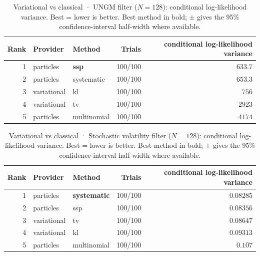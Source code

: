 \begin{table}[!htbp]
\centering
\small
\caption{Variational vs classical · UNGM filter ($N=128$): conditional log-likelihood variance. Best = lower is better. Best method in bold; $\pm$ gives the 95\% confidence-interval half-width where available.}
\label{tab:variational-vs-classical-ungm-filter-conditional-loglik-variance}
\begin{tabular}{rllrr}
\toprule
Rank & Provider & Method & Trials & conditional log-likelihood variance \\
\midrule
1 & particles & \textbf{ssp} & 100/100 & $\mathbf{633.7}$ \\
2 & particles & systematic & 100/100 & $653.3$ \\
3 & variational & kl & 100/100 & $756$ \\
4 & variational & tv & 100/100 & $2923$ \\
5 & particles & multinomial & 100/100 & $4174$ \\
\bottomrule
\end{tabular}
\end{table}


\begin{table}[!htbp]
\centering
\small
\caption{Variational vs classical · Stochastic volatility filter ($N=128$): conditional log-likelihood variance. Best = lower is better. Best method in bold; $\pm$ gives the 95\% confidence-interval half-width where available.}
\label{tab:variational-vs-classical-stochastic-volatility-filter-conditional-loglik-variance}
\begin{tabular}{rllrr}
\toprule
Rank & Provider & Method & Trials & conditional log-likelihood variance \\
\midrule
1 & particles & \textbf{systematic} & 100/100 & $\mathbf{0.08285}$ \\
2 & particles & ssp & 100/100 & $0.08356$ \\
3 & variational & tv & 100/100 & $0.08647$ \\
4 & variational & kl & 100/100 & $0.09313$ \\
5 & particles & multinomial & 100/100 & $0.107$ \\
\bottomrule
\end{tabular}
\end{table}


